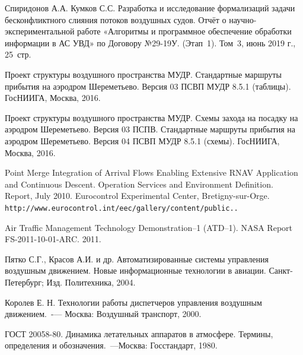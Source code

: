 \documentclass[12pt, a4 paper]{article}
\theoremstyle{plain}
\begin{document}
\begin{thebibliography}{8}

 Спиридонов А.А. Кумков С.С. Разработка и исследование формализаций задачи бесконфликтного слияния потоков воздушных судов. Отчёт о научно-экспериментальной работе «Алгоритмы и программное обеспечение обработки информации в АС УВД» по Договору №29-19У. (Этап~1). Том~3, июнь 2019 г., 25~стр.
 
 Проект структуры воздушного пространства МУДР. Стандартные маршруты прибытия на аэродром Шереметьево. Версия 03 ПСВП МУДР 8.5.1 (таблицы). ГосНИИГА, Москва, 2016.

 Проект структуры воздушного пространства МУДР. Схемы захода на посадку на аэродром Шереметьево. Версия 03 ПСПВ. Стандартные маршруты прибытия на аэродром Шереметьево. Версия 04 ПСВП МУДР 8.5.1 (схемы). ГосНИИГА, Москва, 2016.

 Point Merge Integration of Arrival Flows Enabling Extensive RNAV Application and Continuous Descent. Operation Services and Environment Definition. Report, July 2010. Eurocontrol Experimental Center, Bretigny-sur-Orge.\\
\texttt{http://www.eurocontrol.int/eec/gallery/content/public..}

 Air Traffic Management Technology Demonstration--1 (ATD--1). NASA Report FS-2011-10-01-ARC. 2011.

 Пятко С.Г., Красов А.И. и др. Автоматизированные системы управления воздушным движением. Новые информационные технологии в авиации. Санкт-Петербург; Изд. Политехника, 2004.

 Королев Е. Н. Технологии работы диспетчеров управления воздушным движением.~-— Москва: Воздушный транспорт, 2000.

 ГОСТ 20058-80. Динамика летательных аппаратов в атмосфере. Термины, определения и обозначения.~---Москва: Госстандарт, 1980.


\end{thebibliography}
\end{document}
